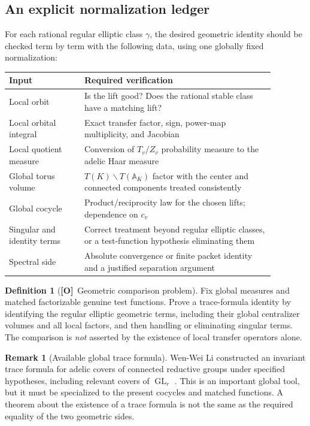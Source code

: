\documentclass[11pt]{article}
\newcommand{\A}{\mathbb A}
\newcommand{\GL}{\operatorname{GL}}
\newcommand{\Otag}{\textnormal{\textbf{[O]}}}
\theoremstyle{plain}
\theoremstyle{definition}
\newtheorem{definition}[theorem]{Definition}
\newtheorem{remark}[theorem]{Remark}
\begin{document}
\subsection{An explicit normalization ledger}\label{subsec:ledger}
For each rational regular elliptic class $\gamma$, the desired
geometric identity should be checked term by term with the following
data, using one globally fixed normalization:
\begin{center}\small
\begin{tabular}{@{}p{0.25\linewidth}p{0.63\linewidth}@{}}
\toprule
Input & Required verification\\\midrule
Local orbit & Is the lift good? Does the rational stable class have a matching lift?\\
Local orbital integral & Exact transfer factor, sign, power-map multiplicity, and Jacobian\\
Local quotient measure & Conversion of $T_v/Z_v$ probability measure to the adelic Haar measure\\
Global torus volume & $T(K)\backslash T(\A_K)$ factor with the center and connected components treated consistently\\
Global cocycle & Product/reciprocity law for the chosen lifts; dependence on $c_v$\\
Singular and identity terms & Correct treatment beyond regular elliptic classes, or a test-function hypothesis eliminating them\\
Spectral side & Absolute convergence or finite packet identity and a justified separation argument\\
\bottomrule
\end{tabular}
\end{center}

\begin{definition}[\Otag\ Geometric comparison problem]\label{def:geom}
Fix global measures and matched factorizable genuine test
functions.  Prove a trace-formula identity by identifying the
regular elliptic geometric terms, including their global centralizer
volumes and all local factors, and then handling or eliminating
singular terms.  The comparison is \emph{not} asserted by the
existence of local transfer operators alone.
\end{definition}

\begin{remark}[Available global trace formula]
Wen-Wei Li constructed an invariant trace formula for adelic
covers of connected reductive groups under specified hypotheses,
including relevant covers of $\GL_r$ \cite{Li14}.  This is an
important global tool, but it must be specialized to the present
cocycles and matched functions.  A theorem about the existence of a
trace formula is not the same as the required equality of the two
geometric sides.
\end{remark}
\end{document}
